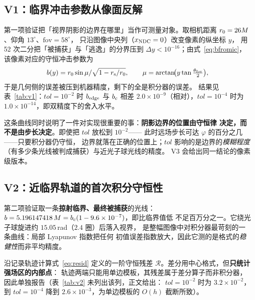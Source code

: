 \subsection{V1：临界冲击参数从像面反解}\label{sec:v1}

第一项验证把「视界阴影的边界在哪里」当作可测量对象。取相机距离
$r_0=26M$、仰角 $13^\circ$、$\mathrm{fov}=58^\circ$，
只沿图像中央列（$x_{\rm NDC}=0$）改变像素的纵坐标 $y$，
用 52 次二分把「被捕获」与「逃逸」的分界压到
$\Delta y<10^{-16}$；由式~\eqref{eq:bfromic}，
该像素对应的守恒冲击参数为
\begin{equation}
b(y)=r_0\sin\mu/\sqrt{1-r_{\mathrm s}/r_0},\qquad
\mu=\arctan\!\bigl(y\tan\tfrac{\theta_{\rm fov}}{2}\bigr),
\label{eq:bofy}
\end{equation}
于是几何侧的误差被压到机器精度，剩下的全是积分器的误差。
结果见表~\ref{tab:v1}：$tol=10^{-2}$ 时 $b_{\rm edge}$ 与
$b_{c}$ 相差 $2.0\times10^{-9}$（相对），$tol=10^{-4}$ 时为
$1.0\times10^{-14}$，即双精度下的舍入水平。



这条曲线同时说明了一件对实现很重要的事：\textbf{阴影边界的位置由守恒律
决定，而不是由步长决定}。即使把 $tol$ 放松到 $10^{-2}$——
此时远场步长可达 $\varphi$ 的百分之几——只要积分器仍守恒，
边界就落在正确的位置上；$tol$ 影响的是边界的\emph{模糊程度}
（有多少条光线被判成捕获）与近光子球光线的精度。
V3 会给出同一结论的像素级版本。

\subsection{V2：近临界轨道的首次积分守恒性}\label{sec:v2}

第二项验证取一条\textbf{掠射临界、最终被捕获}的光线：
$b=5.196147418\,M=b_{c}(1-9.6\times10^{-7})$，即比临界值低
不足百万分之一。它绕光子球旋进约 $15.05$\,rad（$2.4$ 圈）后落入视界，
是整幅图像中对积分器最苛刻的一条曲线：局部 Lyapunov 指数把任何
初值误差指数放大，因此它测的是格式的\emph{稳健性}而非平均精度。

沿记录轨迹计算式~\eqref{eq:resid} 定义的一阶守恒残差
$\mathcal R$。差分用中心格式，但\textbf{只统计强场区的内部点}：
轨迹两端只能用单边模板，其残差属于差分算子而非积分器，
因此单独报告（表~\ref{tab:v2} 未列出该列，正文给出：
$tol=10^{-2}$ 时为 $3.2\times10^{-2}$，到 $tol=10^{-4}$ 降到
$2.6\times10^{-3}$，为单边模板的 $O(h)$ 截断所致）。\label{pg:ends}

